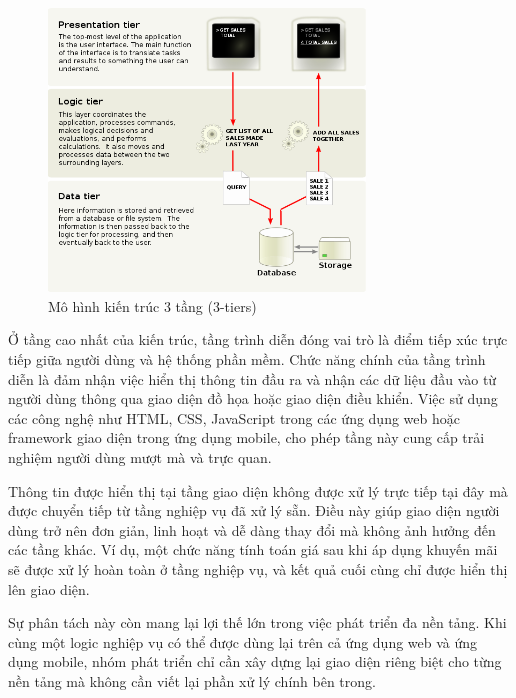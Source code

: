\begin{figure}[H]
  \centering
  \includegraphics[width=0.75\textwidth]{images/layer.png}
  \caption{Mô hình kiến trúc 3 tầng (3-tiers)}
  \label{fig:15}
\end{figure}
  
  \begin{flushleft}
  \hspace*{0.8cm}Ở tầng cao nhất của kiến trúc, tầng trình diễn đóng vai trò là điểm tiếp xúc trực tiếp giữa người dùng và hệ thống phần mềm. Chức năng chính của tầng trình diễn là đảm nhận việc hiển thị thông tin đầu ra và nhận các dữ liệu đầu vào từ người dùng thông qua giao diện đồ họa hoặc giao diện điều khiển. Việc sử dụng các công nghệ như HTML, CSS, JavaScript trong các ứng dụng web hoặc framework giao diện trong ứng dụng mobile, cho phép tầng này cung cấp trải nghiệm người dùng mượt mà và trực quan.
  \end{flushleft}
  
  \begin{flushleft}
  \hspace*{0.8cm}Thông tin được hiển thị tại tầng giao diện không được xử lý trực tiếp tại đây mà được chuyển tiếp từ tầng nghiệp vụ đã xử lý sẵn. Điều này giúp giao diện người dùng trở nên đơn giản, linh hoạt và dễ dàng thay đổi mà không ảnh hưởng đến các tầng khác. Ví dụ, một chức năng tính toán giá sau khi áp dụng khuyến mãi sẽ được xử lý hoàn toàn ở tầng nghiệp vụ, và kết quả cuối cùng chỉ được hiển thị lên giao diện.
  \end{flushleft}
  
  \begin{flushleft}
  \hspace*{0.8cm}Sự phân tách này còn mang lại lợi thế lớn trong việc phát triển đa nền tảng. Khi cùng một logic nghiệp vụ có thể được dùng lại trên cả ứng dụng web và ứng dụng mobile, nhóm phát triển chỉ cần xây dựng lại giao diện riêng biệt cho từng nền tảng mà không cần viết lại phần xử lý chính bên trong.
  \end{flushleft}
  
